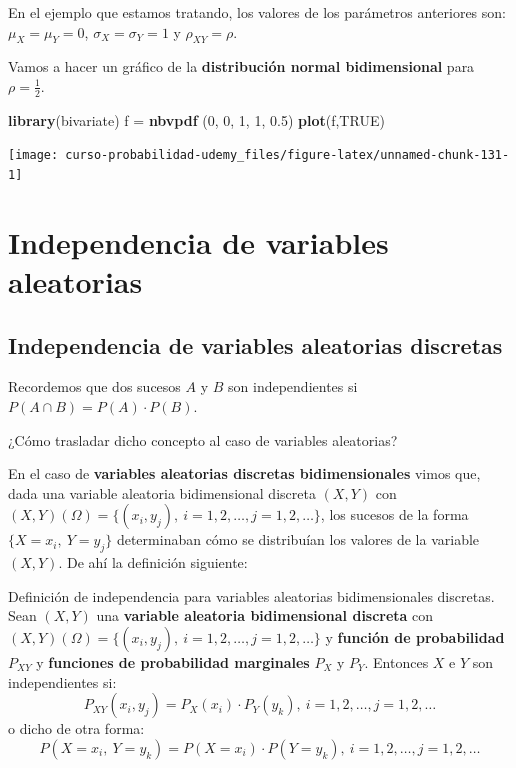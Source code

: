 \documentclass[]{book}
\newenvironment{Shaded}{\begin{snugshade}}{\end{snugshade}}
\newcommand{\DecValTok}[1]{\textcolor[rgb]{0.00,0.00,0.81}{#1}}
\newcommand{\FloatTok}[1]{\textcolor[rgb]{0.00,0.00,0.81}{#1}}
\newcommand{\KeywordTok}[1]{\textcolor[rgb]{0.13,0.29,0.53}{\textbf{#1}}}
\newcommand{\NormalTok}[1]{#1}
\newcommand{\OtherTok}[1]{\textcolor[rgb]{0.56,0.35,0.01}{#1}}
\newcommand{\StringTok}[1]{\textcolor[rgb]{0.31,0.60,0.02}{#1}}
\begin{document}
En el ejemplo que estamos tratando, los valores de los parámetros anteriores son: \(\mu_X=\mu_Y=0\), \(\sigma_X=\sigma_Y=1\) y \(\rho_{XY}=\rho.\)

Vamos a hacer un gráfico de la \textbf{distribución normal bidimensional} para \(\rho=\frac{1}{2}.\)

\begin{Shaded}
\begin{Highlighting}[]
\KeywordTok{library}\NormalTok{(bivariate)}
\NormalTok{f =}\StringTok{ }\KeywordTok{nbvpdf}\NormalTok{ (}\DecValTok{0}\NormalTok{, }\DecValTok{0}\NormalTok{, }\DecValTok{1}\NormalTok{, }\DecValTok{1}\NormalTok{, }\FloatTok{0.5}\NormalTok{)}
\KeywordTok{plot}\NormalTok{(f,}\OtherTok{TRUE}\NormalTok{)}
\end{Highlighting}
\end{Shaded}

\begin{center}\texttt{[image: curso-probabilidad-udemy\_files/figure-latex/unnamed-chunk-131-1]} \end{center}

\hypertarget{independencia-de-variables-aleatorias}{%
\section{Independencia de variables aleatorias}\label{independencia-de-variables-aleatorias}}

\hypertarget{independencia-de-variables-aleatorias-discretas}{%
\subsection{Independencia de variables aleatorias discretas}\label{independencia-de-variables-aleatorias-discretas}}

Recordemos que dos sucesos \(A\) y \(B\) son independientes si \(P(A\cap B)=P(A)\cdot P(B)\).

¿Cómo trasladar dicho concepto al caso de variables aleatorias?

En el caso de \textbf{variables aleatorias discretas bidimensionales} vimos que, dada una variable aleatoria bidimensional discreta \((X,Y)\) con \((X,Y)(\Omega)=\{(x_i,y_j),\ i=1,2,\ldots,j=1,2,\ldots\}\), los sucesos de la forma \(\{X=x_i,\  Y=y_j\}\) determinaban cómo se distribuían los valores de la variable \((X,Y)\). De ahí la definición siguiente:

Definición de independencia para variables aleatorias bidimensionales discretas.
Sean \((X,Y)\) una \textbf{variable aleatoria bidimensional discreta} con \((X,Y)(\Omega)=\{(x_i,y_j),\ i=1,2,\ldots,j=1,2,\ldots\}\) y \textbf{función de probabilidad} \(P_{XY}\) y \textbf{funciones de probabilidad marginales} \(P_X\) y \(P_Y\). Entonces \(X\) e \(Y\) son independientes si:
\[
P_{XY}(x_i,y_j)=P_X(x_i)\cdot P_Y(y_k),\ i=1,2,\ldots,j=1,2,\ldots
\]
o dicho de otra forma:
\[
P(X=x_i,\ Y=y_k)=P(X=x_i)\cdot P(Y=y_k),\ i=1,2,\ldots,j=1,2,\ldots
\]
\end{document}
